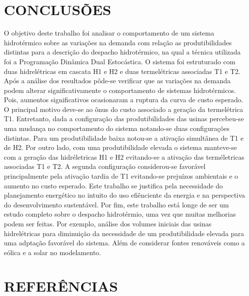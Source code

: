 \documentclass[12pt,fleqn]{article}
\begin{document}
\section{CONCLUS\~OES}
O objetivo deste trabalho foi analisar o comportamento de um sistema hidrot\'ermico sobre as varia\c c\~oes na demanda com rela\c c\~ao as produtibilidades distintas para a descri\c c\~ao do despacho hidrot\'ermico, na  qual a t\'ecnica utilizada foi a Programa\c c\~ao Din\^amica Dual Estoc\'astica. O sistema foi estruturado com duas hidrel\'etricas em cascata H1 e H2 e duas termel\'etricas associadas T1 e T2. Ap\'os a an\'alise dos resultados p\^ode-se verificar que as varia\c c\~oes na demanda podem alterar significativamente o comportamento de sistemas hidrot\'ermicos. Pois, aumentos significativos ocasionaram a ruptura da curva de custo esperado. O principal motivo deve-se ao \^onus do custo associado a gera\c c\~ao da termel\'etrica T1. Entretanto, dada a configura\c c\~ao das produtibilidades das usinas percebeu-se uma mudan\c ca no comportamento do sistema notando-se duas configura\c c\~oes distintas. Para um produtibilidade baixa notou-se a ativa\c c\~ao simult\^anea de T1 e de H2. Por outro lado, com uma produtibilidade elevada o sistema manteve-se com a gera\c c\~ao das hidr\'eletricas H1 e H2 evitando-se a ativa\c c\~ao das term\'eletricas associadas T1 e T2. A segunda configura\c c\~ao considerou-se favor\'avel principalmente pela ativa\c c\~ao tardia de T1 evitando-se preju\'izos ambientais e o aumento no custo esperado. Este trabalho se justifica pela necessidade do planejamento energ\'etico no intuito do uso efi\^enciente da energia e na perspectiva do desenvolvimento sustent\'avel. Por fim, este trabalho est\'a longe de ser um estudo completo sobre o despacho hidrot\'ermio, uma vez que muitas melhorias podem ser feitas. Por exemplo, an\'alise dos volumes iniciais das usinas hidrel\'etricas para diminui\c c\~ao da necessidade de um produtibilidade elevada para uma adpta\c c\~ao favor\'avel do sistema. Al\'em de considerar fontes renov\'aveis como a e\'olica e a solar no
modelamento.
\expandafter\def\expandafter\UrlBreaks\expandafter{\UrlBreaks%
  \do\a\do\b\do\c\do\d\do\e\do\f\do\g\do\h\do\i\do\j%
  \do\k\do\l\do\m\do\n\do\o\do\p\do\q\do\r\do\s\do\t%
  \do\u\do\v\do\w\do\x\do\y\do\z\do\A\do\B\do\C\do\D%
  \do\E\do\F\do\G\do\H\do\I\do\J\do\K\do\L\do\M\do\N%
  \do\O\do\P\do\Q\do\R\do\S\do\T\do\U\do\V\do\W\do\X%
  \do\Y\do\Z}
\section*{REFER\^ENCIAS}
\end{document}

